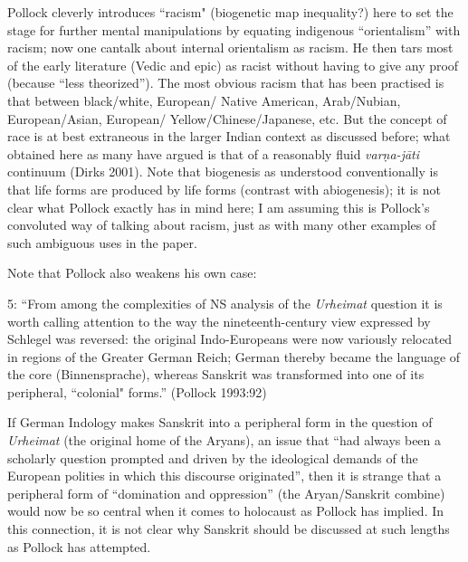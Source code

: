 {\begin{enumerate}
Pollock cleverly introduces “racism" (biogenetic map inequality?) here to set the stage for further mental manipulations by equating indigenous “orientalism” with racism; now one can\break talk about internal orientalism as racism. He then tars most of the early literature (Vedic and epic) as racist without having to give any proof (because “less theorized”). The most obvious racism that has been practised is that between black/white, European/ Native American, Arab/Nubian, European/Asian, European/ Yellow/Chinese/Japanese, etc. But the concept of race is at best extraneous in the larger Indian context as discussed before; what obtained here as many have argued is that of a reasonably fluid {\sl varṇa-jāti} continuum (Dirks 2001). Note that biogenesis as understood conventionally is that life forms are  produced by life forms (contrast with abiogenesis); it is not clear what Pollock exactly has in mind here; I am assuming this is Pollock’s convoluted way of talking about racism, just as with many other examples of such ambiguous uses in the paper.

Note that Pollock also weakens his own case:
\begin{myquote}
5: “From among the complexities of NS analysis of the {\sl Urheimat} question it is worth calling attention to the way the nineteenth-century view expressed by Schlegel was reversed: the original Indo-Europeans were now variously relocated in regions of the Greater German Reich; German thereby became the language of the core (Binnensprache), whereas Sanskrit was transformed into one of its peripheral, ``colonial" forms.” \hfill 	(Pollock 1993:92)
\end{myquote}
\medskip

If German Indology makes Sanskrit into a peripheral form in the question of {\sl Urheimat} (the original home of the Aryans), an issue that “had always been a scholarly question prompted and driven by the ideological demands of the European polities in which this discourse originated”, then it is strange that a peripheral form of “domination and oppression” (the Aryan/Sanskrit combine) would now be so central when it comes to holocaust as Pollock has implied. In this connection, it is not clear why Sanskrit should be discussed at such lengths as Pollock has attempted.


\end{enumerate}}
